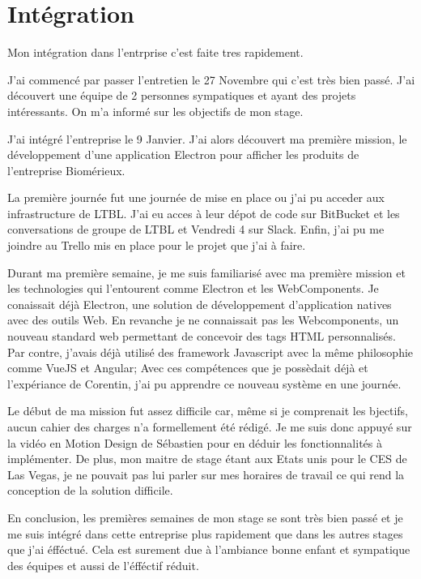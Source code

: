 \documentclass{article}
\begin{document}
\section{Intégration}

Mon intégration dans l'entrprise c'est faite tres rapidement.

J'ai commencé par passer l'entretien le 27 Novembre qui c'est très bien passé.
J'ai découvert une équipe de 2 personnes sympatiques et ayant des projets intéressants.
On m'a informé sur les objectifs de mon stage.

J'ai intégré l'entreprise le 9 Janvier.
J'ai alors découvert ma première mission, le développement d'une application Electron pour afficher les produits de l'entreprise Biomérieux.

La première journée fut une journée de mise en place ou j'ai pu acceder aux infrastructure de LTBL.
J'ai eu acces à leur dépot de code sur BitBucket et les conversations de groupe de LTBL et Vendredi 4 sur Slack.
Enfin, j'ai pu me joindre au Trello mis en place pour le projet que j'ai à faire.

Durant ma première semaine, je me suis familiarisé avec ma première mission et les technologies qui l'entourent comme Electron et les WebComponents.
Je conaissait déjà Electron, une solution de développement d'application natives avec des outils Web.
En revanche je ne connaissait pas les Webcomponents, un nouveau standard web permettant de concevoir des tags HTML personnalisés.
Par contre, j'avais déjà utilisé des framework Javascript avec la même philosophie comme VueJS et Angular;
Avec ces compétences que je possèdait déjà et l'expériance de Corentin, j'ai pu apprendre ce nouveau système en une journée.

Le début de ma mission fut assez difficile car, même si je comprenait les bjectifs, aucun cahier des charges n'a formellement été rédigé.
Je me suis donc appuyé sur la vidéo en Motion Design de Sébastien pour en déduir les fonctionnalités à implémenter.
De plus, mon maitre de stage étant aux Etats unis pour le CES de Las Vegas, je ne pouvait pas lui parler sur mes horaires de travail ce qui rend la conception de la solution difficile.

En conclusion, les premières semaines de mon stage se sont très bien passé et je me suis intégré dans cette entreprise plus rapidement que dans les autres stages que j'ai éfféctué.
Cela est surement due à l'ambiance bonne enfant et sympatique des équipes et aussi de l'éfféctif réduit.
\end{document}

